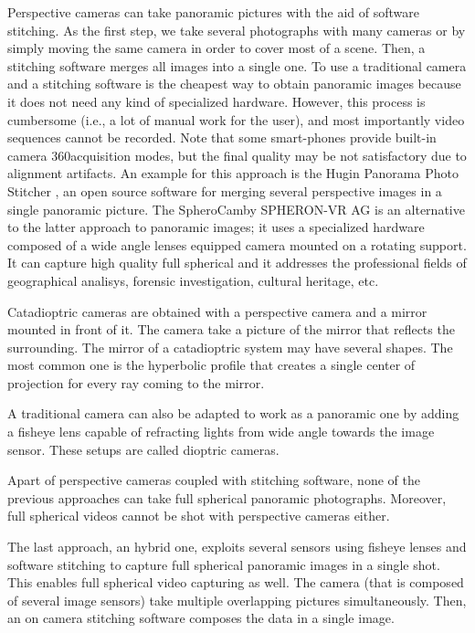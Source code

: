 Perspective cameras can take panoramic pictures with the aid of software stitching. As the first step, we take several photographs with many cameras or by simply moving the same camera in order to cover most of a scene. Then, a stitching software merges all images into a single one. To use a traditional camera and a stitching software is the cheapest way to obtain panoramic images because it does not need any kind of specialized hardware. However, this process is cumbersome (i.e., a lot of manual work for the user), and most importantly video sequences cannot be recorded. Note that some smart-phones provide built-in camera 360\degree acquisition modes, but the final quality may be not satisfactory due to alignment artifacts.
An example for this approach is the Hugin Panorama Photo Stitcher 
\cite{hugin_photostitcher}, an open source software for merging several 
perspective images in a single panoramic picture.
The SpheroCam\texttrademark by SPHERON-VR AG\texttrademark \cite{spheronvr}
is an alternative to 
the latter approach to panoramic images; it uses a specialized hardware composed
of a wide angle lenses equipped camera mounted on a rotating support. It can 
capture high quality full spherical and it addresses the professional fields of 
geographical analisys, forensic investigation, cultural heritage, etc.


Catadioptric cameras are obtained with a perspective camera and a mirror mounted in front of it. The camera take a picture of the mirror that reflects the surrounding. The mirror of a catadioptric system may have several shapes. The most common one is the hyperbolic profile that creates a single center of 
projection for every ray coming to the mirror.

A traditional camera can also be adapted to work as a panoramic one by adding a fisheye lens capable of refracting lights from wide angle towards the image sensor. These setups are called dioptric cameras.

Apart of perspective cameras coupled with stitching software, none of the previous approaches can take full spherical panoramic photographs. Moreover, full spherical videos cannot be shot with perspective cameras either.

The last approach, an hybrid one, exploits several sensors using fisheye lenses and software stitching to capture full spherical panoramic images in a single shot. This enables full spherical video capturing as well. The camera (that is composed of several image sensors) take multiple overlapping pictures simultaneously. Then, an on camera stitching software composes the data in a single image.


